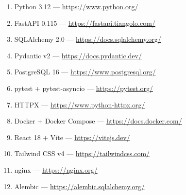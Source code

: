\documentclass[12pt,a4paper]{article}
\begin{document}
\begin{enumerate}
    \item Python 3.12 --- \url{https://www.python.org/}
    \item FastAPI 0.115 --- \url{https://fastapi.tiangolo.com/}
    \item SQLAlchemy 2.0 --- \url{https://docs.sqlalchemy.org/}
    \item Pydantic v2 --- \url{https://docs.pydantic.dev/}
    \item PostgreSQL 16 --- \url{https://www.postgresql.org/}
    \item pytest + pytest-asyncio --- \url{https://pytest.org/}
    \item HTTPX --- \url{https://www.python-httpx.org/}
    \item Docker + Docker Compose --- \url{https://docs.docker.com/}
    \item React 18 + Vite --- \url{https://vitejs.dev/}
    \item Tailwind CSS v4 --- \url{https://tailwindcss.com/}
    \item nginx --- \url{https://nginx.org/}
    \item Alembic --- \url{https://alembic.sqlalchemy.org/}
\end{enumerate}
\end{document}
